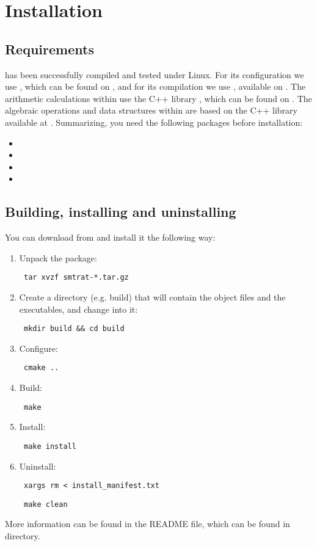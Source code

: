 \chapter{Installation}
\label{chapter:installation}
\section{Requirements}
\smtrat has been successfully compiled and tested under Linux. For its configuration we use \cmake, which can be found on \cmakeURL, and for its compilation we use \gplusplus, available on \gplusplusURL. The arithmetic calculations within \smtrat use the C++ library \ginac, which can be found on \ginacURL. The algebraic operations and data structures within \smtrat are based on the C++ library \ginacra available at \ginacraURL. Summarizing, you need the following packages before installation:
\begin{itemize}
	\item \gplusplus
	\item \cmake
	\item \ginac
	\item \ginacra
\end{itemize}

\section{Building, installing and uninstalling \smtrat}
You can download \smtrat from \smtratURL and install it the following way:

\begin{enumerate}
	\item Unpack the package:
		\begin{verbatim} tar xvzf smtrat-*.tar.gz \end{verbatim}
	\item Create a directory (e.g. build) that will contain the object files and the executables, and change into it:
		\begin{verbatim} mkdir build && cd build\end{verbatim}
	\item Configure:
		\begin{verbatim} cmake .. \end{verbatim}
	\item Build: 
		\begin{verbatim} make \end{verbatim}
	\item Install: 
		\begin{verbatim} make install \end{verbatim}
	\item Uninstall: 
		\begin{verbatim} xargs rm < install_manifest.txt \end{verbatim}
		\begin{verbatim} make clean \end{verbatim}
\end{enumerate}

More information can be found in the README file, which can be found in \smtrat directory.


